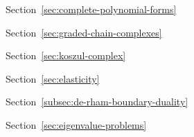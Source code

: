 \par\noindent\hspace*{0em}\label{index:degree-of-freedom-dof}\quad Section~\ref{sec:complete-polynomial-forms}

\par\noindent\hspace*{0em}\label{index:differential}\quad Section~\ref{sec:graded-chain-complexes}

\par\noindent\hspace*{1em}\label{index:differential-koszul}\quad Section~\ref{sec:koszul-complex}

\par\noindent\hspace*{0em}\label{index:displacement}\quad Section~\ref{sec:elasticity}

\par\noindent\hspace*{0em}\label{index:dof}\quad \hyperref[index:degree-of-freedom-dof]{}

\par\noindent\hspace*{0em}\label{index:duality-poincar-lefschetz}\quad Section~\ref{subsec:de-rham-boundary-duality}

\par\noindent\hspace*{0em}\label{index:eigenvalue-problem}

\par\noindent\hspace*{1em}\label{index:eigenvalue-problem-hodge-laplace}\quad Section~\ref{sec:eigenvalue-problems}

